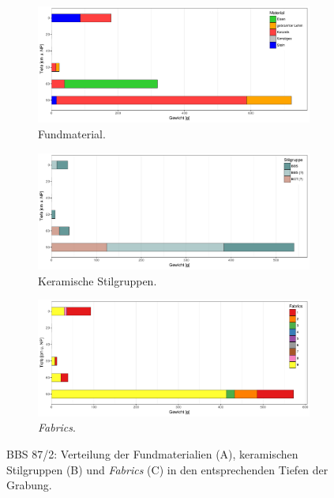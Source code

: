 \begin{figure}[p]
	\centering
	\begin{subfigure}[t]{\textwidth}
		\centering
		\includegraphics[width=\textwidth]{fig/9-7_BBS87-2_VerteilungFunde_R.pdf}
		\caption{Fundmaterial.\vspace{1em}}
		\label{fig:BBS87-2_VerteilungFunde}
	\end{subfigure}
	\begin{subfigure}[t]{\textwidth}
		\centering
		\includegraphics[width=\textwidth]{fig/9-7_BBS87-2_KeramikStilgruppen_R.pdf}
		\caption{Keramische Stilgruppen.\vspace{1em}}
		\label{fig:BBS87-2_VerteilungStilgr}
	\end{subfigure}
	\begin{subfigure}[t]{\textwidth}
		\centering
		\includegraphics[width=\textwidth]{fig/9-7_BBS87-2_Fabrics_R.pdf}
		\caption{\textit{Fabrics}.}
		\label{fig:BBS87-2_VerteilungFabrics}
	\end{subfigure}
	\caption{BBS 87/2: Verteilung der Fundmaterialien (A), keramischen Stilgruppen (B) und \textit{Fabrics} (C) in den entsprechenden Tiefen der Grabung.}
	\label{fig:BBS87_2_Funde}
\end{figure}

